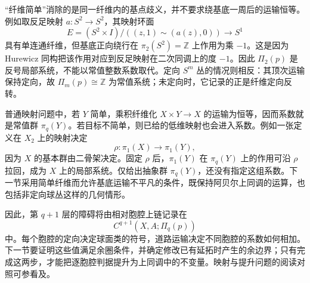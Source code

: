 “纤维简单”消除的是同一纤维内的基点歧义，并不要求绕基底一周后的运输恒等。例如取反足映射 \(a:S^2\to S^2\)，其映射环面
\[
	E=(S^2\times I)/((z,1)\sim(a(z),0))\longrightarrow S^1
\]
具有单连通纤维，但基底正向绕行在 \(\pi_2(S^2)=\mathbb Z\) 上作用为乘 \(-1\)。这是因为 Hurewicz 同构把该作用对应到反足映射在二次同调上的度 \(-1\)。因此 \(\Pi_2(p)\) 是反号局部系统，不能以常值整数系数取代。定向 \(S^m\) 丛的情况则相反：其顶次运输保持定向，故 \(\Pi_m(p)\cong\mathbb Z\) 为常值系统；未定向时，它记录的正是纤维定向反转。

\ProseParagraphBreak

普通映射问题中，若 \(Y\) 简单，乘积纤维化 \(X\times Y\to X\) 的运输为恒等，因而系数就是常值群 \(\pi_q(Y)\)。若目标不简单，则已给的低维映射也会进入系数。例如一张定义在 \(X_2\) 上的映射决定
\[
	\rho:\pi_1(X)\longrightarrow\pi_1(Y),
\]
因为 \(X\) 的基本群由二骨架决定。固定 \(\rho\) 后，\(\pi_1(Y)\) 在 \(\pi_q(Y)\) 上的作用可沿 \(\rho\) 拉回，成为 \(X\) 上的局部系统。仅给出抽象群 \(\pi_q(Y)\)，还没有指定这组系数。下一节采用简单纤维而允许基底运输不平凡的条件，既保持阿贝尔上同调的运算，也包括非定向球丛这样的几何情形。

\ProseParagraphBreak

因此，第 \(q+1\) 层的障碍将由相对胞腔上链记录在
\[
	C^{q+1}(X,A;\Pi_q(p))
\]
中。每个胞腔的定向决定球面类的符号，道路运输决定不同胞腔的系数如何相加。下一节要证明这些值满足余圈条件，并确定修改已有延拓时产生的余边界；只有完成这两步，才能把逐胞腔判据提升为上同调中的不变量。映射与提升问题的阅读对照可参看\cite[第4.3节，Obstruction Theory]{Hatcher2002}及\cite[第18章，第5节，Obstruction theory]{May1999}。
